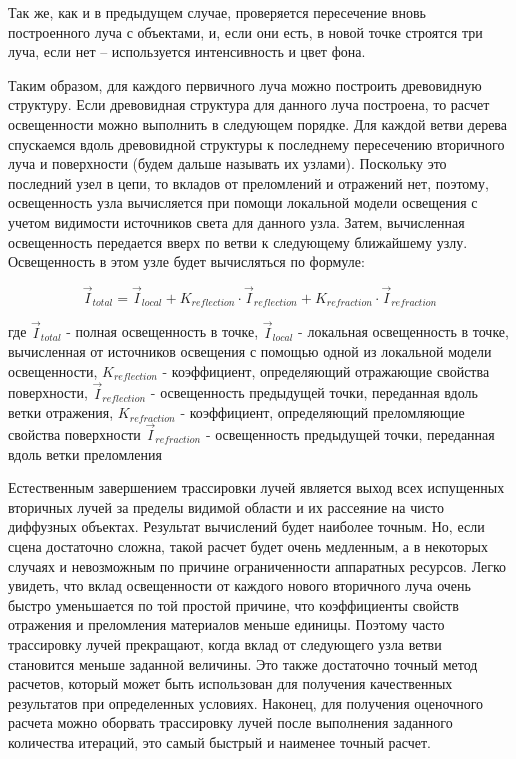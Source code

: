 Так же, как и в предыдущем случае, проверяется пересечение вновь построенного луча с объектами, и, если они есть, в новой точке строятся три луча, если нет -- используется интенсивность и цвет фона.

Таким образом, для каждого первичного луча можно построить древовидную структуру. Если древовидная структура для данного луча построена, то расчет освещенности можно выполнить в следующем порядке. Для каждой ветви дерева спускаемся вдоль древовидной структуры к последнему пересечению вторичного луча и поверхности (будем дальше называть их узлами). Поскольку это последний узел в цепи, то  вкладов от преломлений и отражений нет, поэтому, освещенность узла вычисляется при помощи локальной модели освещения с учетом видимости источников света для данного узла. Затем, вычисленная освещенность передается вверх по ветви к следующему ближайшему узлу. Освещенность в этом узле будет вычисляться по формуле:

$$
 \vec{I}_{total} = \vec{I}_{local} + K_{reflection} \cdot \vec{I}_{reflection} + K_{refraction} \cdot \vec{I}_{refraction}
$$

где $\vec{I}_{total}$ - полная освещенность в точке, $\vec{I}_{local}$ - локальная освещенность в точке, вычисленная от источников освещения с помощью одной из локальной модели освещенности, $K_{reflection}$ - коэффициент, определяющий отражающие свойства поверхности, $\vec{I}_{reflection}$ - освещенность предыдущей точки, переданная вдоль ветки отражения,   $K_{refraction}$ - коэффициент, определяющий преломляющие свойства поверхности $\vec{I}_{refraction}$ - освещенность предыдущей точки, переданная вдоль ветки преломления

Естественным завершением трассировки лучей является выход всех испущенных вторичных лучей за пределы видимой области и их рассеяние на чисто диффузных объектах. Результат вычислений будет наиболее точным. Но, если сцена достаточно сложна, такой расчет будет очень медленным, а в некоторых случаях и невозможным по причине ограниченности аппаратных ресурсов. Легко увидеть, что вклад освещенности от каждого нового вторичного луча очень быстро уменьшается по той простой причине, что коэффициенты свойств отражения и преломления материалов меньше единицы. Поэтому часто трассировку лучей прекращают, когда вклад от следующего узла ветви становится меньше заданной величины. Это также достаточно точный метод расчетов, который может быть использован для получения качественных результатов при определенных условиях. Наконец, для получения оценочного расчета можно оборвать трассировку лучей после выполнения заданного количества итераций, это самый быстрый и наименее точный расчет.

